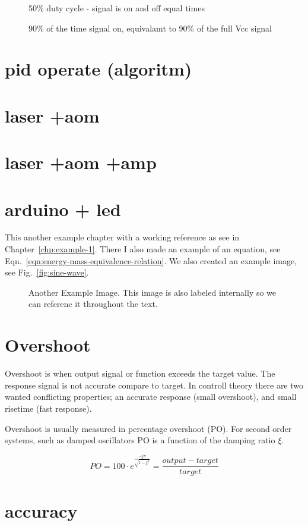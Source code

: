 \documentclass[\main/master.tex]{subfiles}
\begin{document}
\begin{figure}[htbp]
	\centering
	\caption[duty cycle 50\%]{50\% duty cycle  - signal is on and off equal times}
	\label{fig:duty50}
\end{figure}
 
\begin{figure}[htbp]
	\centering
	\caption[duty cycle 90\%]{90\% of the time signal on, equivalamt to 90\% of the full Vcc signal}
	\label{fig:duty90}
\end{figure}














\section{pid operate (algoritm)}
\section{laser +aom}
\section{laser +aom +amp}
\section{arduino + led}
\doublespacing
\hspace{5 mm} This another example chapter with a working reference as see in Chapter~\ref{chp:example-1}. There I also made an example of an equation, see Eqn.~\ref{eqn:energy-mass-equivalence-relation}. We also created an example image, see Fig.~\ref{fig:sine-wave}.
\begin{figure}[htbp]
	\centering
	\caption[Another Example Image]{Another Example Image. This image is also labeled internally so we can referenc it throughout the text.}
	\label{fig:cosine-wave}
\end{figure}


\section{Overshoot}
Overshoot is when output signal or function exceeds the target value. The response signal is not accurate compare to target. In controll theory there are two wanted conflicting properties; an accurate response (small overshoot), and small risetime (fast response). 
\par
Overshoot is usually measured in percentage overshoot (PO). For second order systems, such as damped oscillators PO is a function of the damping ratio $\xi$. 


\begin{equation}
PO = 100\cdot e ^{\frac{-\xi\pi}{\sqrt{1-\xi^2}}} = \frac{output-target}{target}   \label{eqn:percentage_overshoot}
\end{equation}
 
\section{accuracy}
\end{document}
